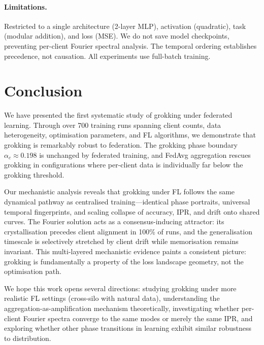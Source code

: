 \documentclass{article}
\begin{document}
\paragraph{Limitations.}
Restricted to a single architecture (2-layer MLP), activation (quadratic), task (modular addition), and loss (MSE).
We do not save model checkpoints, preventing per-client Fourier spectral analysis.
The temporal ordering establishes precedence, not causation.
All experiments use full-batch training.


\section{Conclusion}
\label{sec:conclusion}

We have presented the first systematic study of grokking under federated learning.
Through over 700 training runs spanning client counts, data heterogeneity, optimisation parameters, and FL algorithms, we demonstrate that grokking is remarkably robust to federation.
The grokking phase boundary $\alpha_c \approx 0.198$ is unchanged by federated training, and FedAvg aggregation rescues grokking in configurations where per-client data is individually far below the grokking threshold.

Our mechanistic analysis reveals that grokking under FL follows the same dynamical pathway as centralised training---identical phase portraits, universal temporal fingerprints, and scaling collapse of accuracy, IPR, and drift onto shared curves.
The Fourier solution acts as a consensus-inducing attractor: its crystallisation precedes client alignment in 100\% of runs, and the generalisation timescale is selectively stretched by client drift while memorisation remains invariant.
This multi-layered mechanistic evidence paints a consistent picture: grokking is fundamentally a property of the loss landscape geometry, not the optimisation path.

We hope this work opens several directions: studying grokking under more realistic FL settings (cross-silo with natural data), understanding the aggregation-as-amplification mechanism theoretically, investigating whether per-client Fourier spectra converge to the same modes or merely the same IPR, and exploring whether other phase transitions in learning exhibit similar robustness to distribution.
\end{document}
